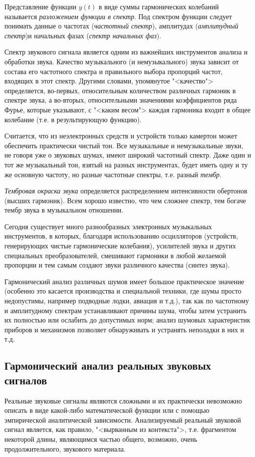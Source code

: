 \documentclass[oneside, final, 14pt]{extreport}
\begin{document}
Представление функции \(y(t)\) в виде суммы гармонических колебаний называется {\itshape разложением функции в спектр}. Под спектром функции следует понимать данные о частотах ({\itshape частотный спектр}), амплитудах ({\itshape амплитудный спектр})и начальных фазах ({\itshape спектр начальных фаз}).

Спектр звукового сигнала является одним из важнейших инструментов анализа и обработки звука.
Качество музыкального (и немузыкального) звука зависит от состава его частотного спектра и правильного выбора пропорций частот, входящих в этот спектр. Другими словами, упомянутое "<качество"> определяется, во-первых, относительным количеством различных гармоник в спектре звука, а во-вторых, относительными значениями коэффициентов
ряда Фурье, которые указывают, с "<каким весом"> каждая гармоника входит в общее колебание (т.е. в результирующую функцию).

Считается, что из неэлектронных средств и устройств только камертон может обеспечить практически чистый
тон. Все музыкальные и немузыкальные звуки, не говоря уже о звуковых шумах, имеют широкий частотный спектр. Даже один и тот же музыкальный тон, взятый на разных инструментах, будет иметь одну и ту же основную частоту, но разные
частотные спектры, т.е. разный {\itshape тембр}.

{\itshape Тембровая окраска звука} определяется распределением интенсивности обертонов (высших гармоник). Всем хорошо известно, что чем сложнее спектр, тем богаче тембр звука в музыкальном отношении.

Сегодня существует много разнообразных электронных музыкальных инструментов, в которых, благодаря использованию осцилляторов (устройств, генерирующих чистые гармонические колебания), усилителей звука и других специальных
преобразователей, смешивают гармоники в любой желаемой пропорции и тем самым создают звуки различного качества (синтез звука).

Гармонический анализ различных шумов имеет большое практическое значение (особенно это касается производства и специальной техники, где шумы просто недопустимы, например подводные лодки, авиация и т.д.), так как по частотному и амплитудному спектрам устанавливают причины шума, чтобы затем устранить их полностью или ослабить до допустимых норм; анализ шумовых характеристик приборов и механизмов позволяет обнаруживать и устранять неполадки в них
и т.д.

\subsection{Гармонический анализ реальных звуковых сигналов}
Реальные звуковые сигналы являются сложными и их практически невозможно описать в виде какой-либо математической
функции или с помощью эмпирической аналитической зависимости. Анализируемый реальный звуковой сигнал является, как правило, "<вырванным из контекста">, т.е. фрагментом некоторой длины, являющимся частью общего, возможно, очень
продолжительного, звукового материала.
\end{document}
